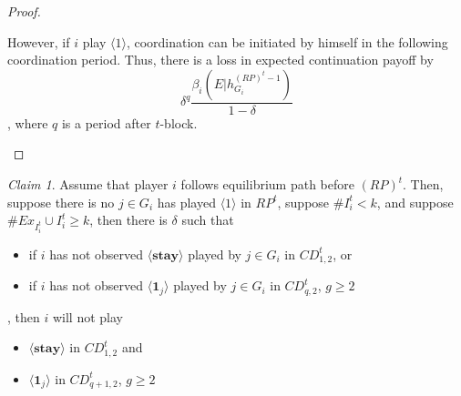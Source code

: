 \documentclass[12pt,letter]{article}
\theoremstyle{definition}
\theoremstyle{remark}
\theoremstyle{claim}
\newtheorem{claim}{Claim}
\begin{document}
\begin{proof}
\begin{itemize}
However, if $i$ play $\langle 1 \rangle$, coordination can be initiated by himself in the following coordination period. Thus, there is a loss in expected continuation payoff by
\[\delta^{q}\frac{\beta_{i}(E|h^{(RP)^t-1}_{G_i})}{1-\delta} \], where $q$ is a period after $t$-block.
\end{itemize}

\end{proof}




\begin{claim} 
\label{claim_report_with_no_message_coordination_period}
Assume that player $i$ follows equilibrium path before $(RP)^t$. Then, suppose there is no $j\in G_i$ has played $\langle 1 \rangle$ in $RP^t$, suppose $\# I^t_i<k$, and suppose $\# Ex_{I^{t}_i}\cup I^{t}_i \geq k$, then there is $\delta$ such that 
\begin{itemize}
\item if $i$ has not observed $\langle \textbf{stay} \rangle$ played by $j\in G_i$ in $CD^t_{1,2}$, or
\item if $i$ has not observed $\langle \mathbf{1}_j \rangle$ played by $j\in G_i$ in $CD^t_{q,2}$, $g\geq 2$
\end{itemize}
, then $i$ will not play
\begin{itemize}
\item $\langle \textbf{stay} \rangle$  in $CD^t_{1,2}$ and
\item $\langle \mathbf{1}_j \rangle$  in $CD^t_{q+1,2}$, $g\geq 2$
\end{itemize}
\end{claim}
\end{document}
